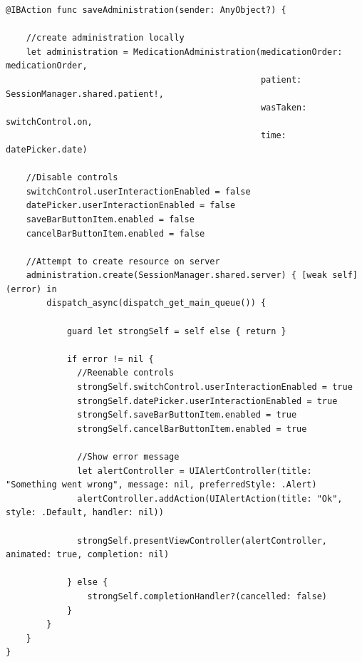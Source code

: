 \documentclass{article}
\begin{document}
\begin{verbatim}
@IBAction func saveAdministration(sender: AnyObject?) {

    //create administration locally
    let administration = MedicationAdministration(medicationOrder: medicationOrder,
                                                  patient: SessionManager.shared.patient!,
                                                  wasTaken: switchControl.on,
                                                  time: datePicker.date)

    //Disable controls
    switchControl.userInteractionEnabled = false
    datePicker.userInteractionEnabled = false
    saveBarButtonItem.enabled = false
    cancelBarButtonItem.enabled = false

    //Attempt to create resource on server
    administration.create(SessionManager.shared.server) { [weak self] (error) in
        dispatch_async(dispatch_get_main_queue()) {

            guard let strongSelf = self else { return }

            if error != nil {
              //Reenable controls
              strongSelf.switchControl.userInteractionEnabled = true
              strongSelf.datePicker.userInteractionEnabled = true
              strongSelf.saveBarButtonItem.enabled = true
              strongSelf.cancelBarButtonItem.enabled = true

              //Show error message
              let alertController = UIAlertController(title: "Something went wrong", message: nil, preferredStyle: .Alert)
              alertController.addAction(UIAlertAction(title: "Ok", style: .Default, handler: nil))

              strongSelf.presentViewController(alertController, animated: true, completion: nil)

            } else {
                strongSelf.completionHandler?(cancelled: false)
            }
        }
    }
}
\end{verbatim}
\end{document}
